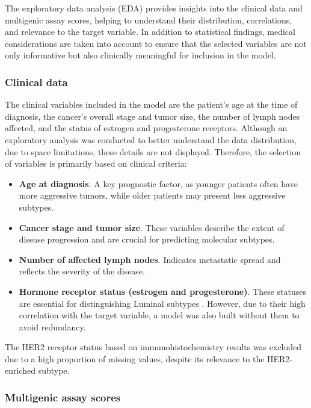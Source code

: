 \documentclass[conference]{IEEEtran}
\begin{document}
The exploratory data analysis (EDA) provides insights into the clinical data and multigenic assay scores, helping to understand their distribution, correlations, and relevance to the target variable. In addition to statistical findings, medical considerations are taken into account to ensure that the selected variables are not only informative but also clinically meaningful for inclusion in the model.

\subsubsection{Clinical data}

The clinical variables included in the model are the patient's age at the time of diagnosis, the cancer's overall stage and tumor size, the number of lymph nodes affected, and the status of estrogen and progesterone receptors. Although an exploratory analysis was conducted to better understand the data distribution, due to space limitations, these details are not displayed. Therefore, the selection of variables is primarily based on clinical criteria:

\begin{itemize}
    \item \textbf{Age at diagnosis}. A key prognostic factor, as younger patients often have more aggressive tumors, while older patients may present less aggressive subtypes. \cite{b4}
    \item \textbf{Cancer stage and tumor size}. These variables describe the extent of disease progression and are crucial for predicting molecular subtypes.
    \item \textbf{Number of affected lymph nodes}.  Indicates metastatic spread and reflects the severity of the disease. \cite{b5}
    \item \textbf{Hormone receptor status (estrogen and progesterone)}. These statuses are essential for distinguishing Luminal subtypes \cite{b6}. However, due to their high correlation with the target variable, a model was also built without them to avoid redundancy.
\end{itemize}

The HER2 receptor status based on immunohistochemistry results was excluded due to a high proportion of missing values, despite its relevance to the HER2-enriched subtype.

\subsubsection{Multigenic assay scores}
\end{document}
